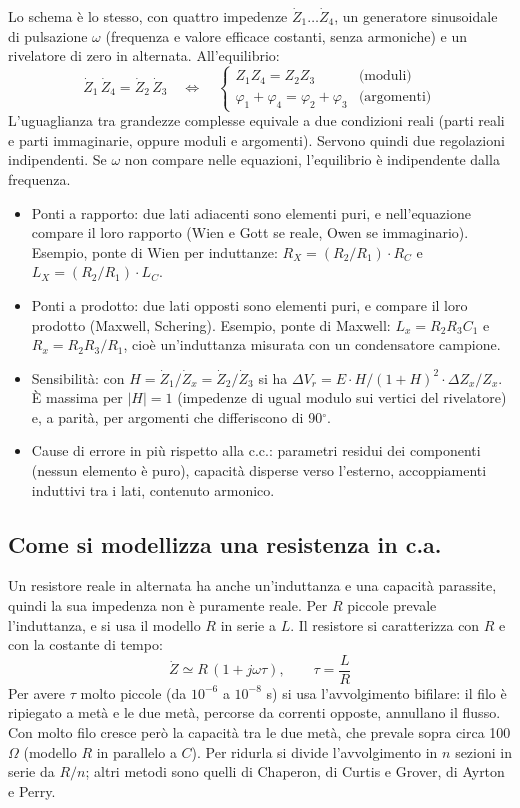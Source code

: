 \documentclass[11pt,a4paper]{article}
\begin{document}
Lo schema è lo stesso, con quattro impedenze $\dot{Z}_1\dots\dot{Z}_4$, un generatore sinusoidale di pulsazione $\omega$ (frequenza e valore efficace costanti, senza armoniche) e un rivelatore di zero in alternata. All'equilibrio:
\[
\dot{Z}_1\,\dot{Z}_4 = \dot{Z}_2\,\dot{Z}_3 \quad\Longleftrightarrow\quad \begin{cases} Z_1 Z_4 = Z_2 Z_3 & \text{(moduli)} \\ \varphi_1 + \varphi_4 = \varphi_2 + \varphi_3 & \text{(argomenti)} \end{cases}
\]
L'uguaglianza tra grandezze complesse equivale a due condizioni reali (parti reali e parti immaginarie, oppure moduli e argomenti). Servono quindi due regolazioni indipendenti. Se $\omega$ non compare nelle equazioni, l'equilibrio è indipendente dalla frequenza.
\begin{itemize}
\item Ponti a rapporto: due lati adiacenti sono elementi puri, e nell'equazione compare il loro rapporto (Wien e Gott se reale, Owen se immaginario). Esempio, ponte di Wien per induttanze: $R_X = (R_2/R_1)\cdot R_C$ e $L_X = (R_2/R_1)\cdot L_C$.
\item Ponti a prodotto: due lati opposti sono elementi puri, e compare il loro prodotto (Maxwell, Schering). Esempio, ponte di Maxwell: $L_x = R_2 R_3 C_1$ e $R_x = R_2 R_3/R_1$, cioè un'induttanza misurata con un condensatore campione.
\item Sensibilità: con $H = \dot{Z}_1/\dot{Z}_x = \dot{Z}_2/\dot{Z}_3$ si ha $\Delta V_r = E\cdot H/(1+H)^2\cdot\Delta Z_x/Z_x$. È massima per $|H| = 1$ (impedenze di ugual modulo sui vertici del rivelatore) e, a parità, per argomenti che differiscono di 90$^\circ$.
\item Cause di errore in più rispetto alla c.c.: parametri residui dei componenti (nessun elemento è puro), capacità disperse verso l'esterno, accoppiamenti induttivi tra i lati, contenuto armonico.
\end{itemize}

\subsection*{Come si modellizza una resistenza in c.a.}

Un resistore reale in alternata ha anche un'induttanza e una capacità parassite, quindi la sua impedenza non è puramente reale. Per $R$ piccole prevale l'induttanza, e si usa il modello $R$ in serie a $L$. Il resistore si caratterizza con $R$ e con la costante di tempo:
\[
\dot{Z} \simeq R\,(1 + j\omega\tau), \qquad \tau = \frac{L}{R}
\]
Per avere $\tau$ molto piccole (da $10^{-6}$ a $10^{-8}$ s) si usa l'avvolgimento bifilare: il filo è ripiegato a metà e le due metà, percorse da correnti opposte, annullano il flusso. Con molto filo cresce però la capacità tra le due metà, che prevale sopra circa 100 $\Omega$ (modello $R$ in parallelo a $C$). Per ridurla si divide l'avvolgimento in $n$ sezioni in serie da $R/n$; altri metodi sono quelli di Chaperon, di Curtis e Grover, di Ayrton e Perry.
\end{document}
